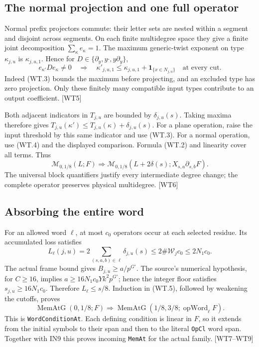 \subsection{The normal projection and one full operator}

Normal prefix projectors commute: their letter sets are nested within a
segment and disjoint across segments. On each finite multidegree space
they give a finite joint decomposition $\sum_\kappa e_\kappa=1$.
The maximum generic-twist exponent on type $\kappa_{j,u}$ is
$\kappa_{j,u,1}$. Hence for
$D\in\{\partial_y,y\cdot,y\partial_y\}$,
\[
 e_{\kappa'}D e_\kappa\ne0
 \quad\Longrightarrow\quad
 \kappa'_{j,u,1}\le
 \kappa_{j,u,1}+\mathbf1_{\{x\in N_{j,u}\}}
 \quad\text{at every cut}.                         \tag{WT.4}
\]
Indeed (WT.3) bounds the maximum before projecting, and an excluded type
has zero projection. Only these finitely many compatible input types
contribute to an output coefficient. \textsf{[WT5]}

Both adjacent indicators in $T_{j,u}$ are bounded by
$\delta_{j,u}(s)$. Taking maxima therefore gives
$T_{j,u}(\kappa')\le T_{j,u}(\kappa)+\delta_{j,u}(s)$.
For a plane operation, raise the input threshold by this same indicator
and use (WT.3). For a normal operation, use (WT.4) and the displayed
comparison. Formula (WT.2) and linearity cover all terms. Thus
\[
 \mathcal M_{0,1/8}(L;F)
 \Longrightarrow
 \mathcal M_{0,1/8}
   (L+2\delta(s);X_{s,a}\partial_{s,b}F).
 \tag{WT.5}
\]
The universal block quantifiers justify every intermediate degree change;
the complete operator preserves physical multidegree. \textsf{[WT6]}

\subsection{Absorbing the entire word}

For an allowed word $\ell$, at most $c_0$ operators occur at each selected
residue. Its accumulated loss satisfies
\[
 L_\ell(j,u)=2\sum_{(s,a,b)\in\ell}\delta_{j,u}(s)
 \le2\#\mathcal W_jc_0\le2N_1c_0.
\]
The actual frame bound gives $B_{j,u}\ge a/p^{G'}$.
The source's numerical hypothesis, for $C\ge16$, implies
$a\ge16N_1c_0Yk^2p^{G'}$; hence the integer floor satisfies
$s_{j,u}\ge16N_1c_0$.
Therefore $L_\ell\le s/8$. Induction in (WT.5), followed by weakening
the cutoffs, proves
\[
 \operatorname{MemAtG}(0,1/8;F)
 \Longrightarrow
 \operatorname{MemAtG}(1/8,3/8;\operatorname{opWord}_\ell F).
 \tag{WT.6}
\]
This is \texttt{WordConditionAt}. Each defining condition is linear in
$F$, so it extends from the initial symbols to their span and then to
the literal \texttt{OpCl} word span. Together with IN9 this proves
incoming \texttt{MemAt} for the actual family. \textsf{[WT7--WT9]}

